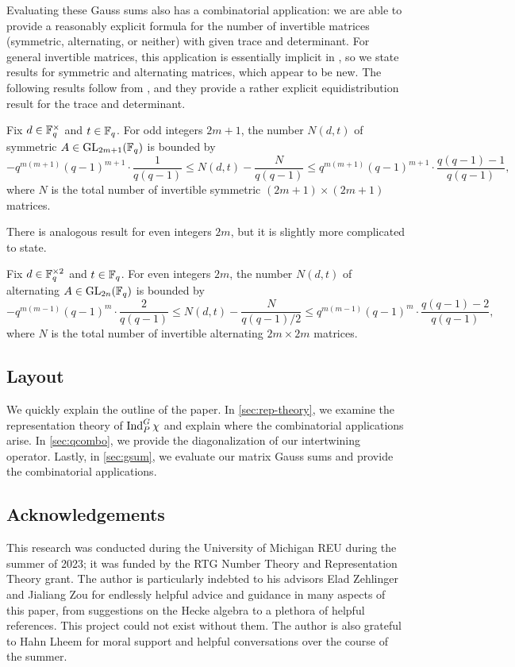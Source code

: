 \documentclass{amsart}
\begin{document}
Evaluating these Gauss sums also has a combinatorial application: we are able to provide a reasonably explicit formula for the number of invertible matrices (symmetric, alternating, or neither) with given trace and determinant. For general invertible matrices, this application is essentially implicit in \cite[Theorem~6.2]{kim-gauss-sum}, so we state results for symmetric and alternating matrices, which appear to be new. The following results follow from , and they provide a rather explicit equidistribution result for the trace and determinant.
\begin{theorem}
    Fix $d\in\mathbb F_q^\times$ and $t\in\mathbb F_q$. For odd integers $2m+1$, the number $N(d,t)$ of symmetric $A\in\mathrm{GL}_{2m+1}(\mathbb F_q)$ is bounded by
    \[-q^{m(m+1)}(q-1)^{m+1}\cdot\frac{1}{q(q-1)}\le N(d,t)-\frac N{q(q-1)}\le q^{m(m+1)}(q-1)^{m+1}\cdot\frac{q(q-1)-1}{q(q-1)},\]
    where $N$ is the total number of invertible symmetric $(2m+1)\times(2m+1)$ matrices.
\end{theorem}
\begin{remark}
    There is analogous result for even integers $2m$, but it is slightly more complicated to state.
\end{remark}
\begin{theorem}
    Fix $d\in\mathbb F_q^{\times2}$ and $t\in\mathbb F_q$. For even integers $2m$, the number $N(d,t)$ of alternating $A\in\mathrm{GL}_{2n}(\mathbb F_q)$ is bounded by
    \[-q^{m(m-1)}(q-1)^m\cdot\frac2{q(q-1)}\le N(d,t)-\frac N{q(q-1)/2}\le q^{m(m-1)}(q-1)^m\cdot\frac{q(q-1)-2}{q(q-1)},\]
    where $N$ is the total number of invertible alternating $2m\times2m$ matrices.
\end{theorem}

\subsection{Layout}
We quickly explain the outline of the paper. In \cref{sec:rep-theory}, we examine the representation theory of $\operatorname{Ind}_P^G\chi$ and explain where the combinatorial applications arise. In \cref{sec:qcombo}, we provide the diagonalization of our intertwining operator. Lastly, in \cref{sec:gsum}, we evaluate our matrix Gauss sums and provide the combinatorial applications.

\subsection{Acknowledgements}
This research was conducted during the University of Michigan REU during the summer of 2023; it was funded by the RTG Number Theory and Representation Theory grant. The author is particularly indebted to his advisors Elad Zehlinger and Jialiang Zou for endlessly helpful advice and guidance in many aspects of this paper, from suggestions on the Hecke algebra to a plethora of helpful references. This project could not exist without them. The author is also grateful to Hahn Lheem for moral support and helpful conversations over the course of the summer.
\end{document}
